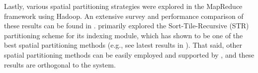 Lastly, various spatial partitioning strategies were explored in the
MapReduce framework using Hadoop. An extensive survey and performance
comparison of these results can be found in
\cite{sato,DBLP:journals/pvldb/EldawyAM15}. \name primarily explored
the Sort-Tile-Recursive (STR) partitioning scheme \cite{str} for its
indexing module, which has shown to be one of the best spatial
partitioning methods (e.g., see latest results in
\cite{DBLP:journals/pvldb/EldawyAM15}). That said, other spatial
partitioning methods can be easily employed and supported by \name,
and these results are orthogonal to the \name system.




